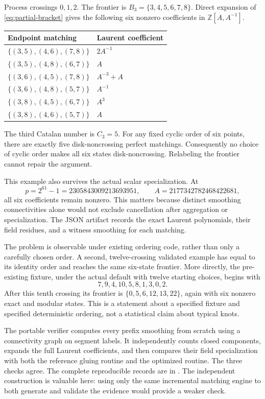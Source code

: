 Process crossings $0,1,2$.  The frontier is
$B_3=\{3,4,5,6,7,8\}$.  Direct expansion of
\eqref{eq:partial-bracket} gives the following six nonzero coefficients in
$\mathbb Z[A,A^{-1}]$.
\begin{center}
\begin{tabular}{ll}
\toprule
Endpoint matching & Laurent coefficient \\
\midrule
$\{(3,5),(4,6),(7,8)\}$ & $2A^{-1}$ \\
$\{(3,5),(4,8),(6,7)\}$ & $A$ \\
$\{(3,6),(4,5),(7,8)\}$ & $A^{-3}+A$ \\
$\{(3,6),(4,8),(5,7)\}$ & $A^{-1}$ \\
$\{(3,8),(4,5),(6,7)\}$ & $A^3$ \\
$\{(3,8),(4,6),(5,7)\}$ & $A$ \\
\bottomrule
\end{tabular}
\end{center}
The third Catalan number is $C_3=5$.  For any fixed cyclic order of six points,
there are exactly five disk-noncrossing perfect matchings.  Consequently no
choice of cyclic order makes all six states disk-noncrossing.  Relabeling the
frontier cannot repair the argument.

This example also survives the actual scalar specialization.  At
\[
 p=2^{61}-1=2305843009213693951,
 \qquad A=2177342782468422681,
\]
all six coefficients remain nonzero.  This matters because distinct smoothing
connectivities alone would not exclude cancellation after aggregation or
specialization.  The JSON artifact records the exact Laurent polynomials, their
field residues, and a witness smoothing for each matching.

The problem is observable under existing ordering code, rather than only a
carefully chosen order.  A second, twelve-crossing validated example has
 equal to its identity order and reaches the same
six-state frontier.  More directly, the pre-existing
 fixture, under the actual default
 with twelve starting choices, begins with
\[
 7,9,4,10,5,8,1,3,0,2.
\]
After this tenth crossing its frontier is
$\{0,5,6,12,13,22\}$, again with six nonzero exact and modular states.
This is a statement about a specified fixture and specified deterministic
ordering, not a statistical claim about typical knots.

The portable verifier
 computes every prefix smoothing
from scratch using a connectivity graph on segment labels.  It independently
counts closed components, expands the full Laurent coefficients, and then
compares their field specialization with both the reference gluing routine and
the optimized  routine.  The three checks agree.  The complete
reproducible records are in .  The
independent construction is valuable here: using only the same incremental
matching engine to both generate and validate the evidence would provide a
weaker check.

